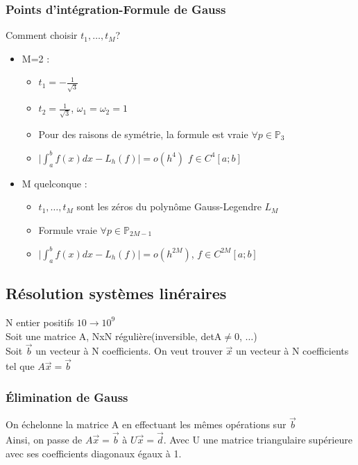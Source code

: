 \documentclass[../main.tex]{subfiles}
\begin{document}
\subsubsection{Points d'intégration-Formule de Gauss}
Comment choisir $t_1, \dots, t_M$?\\
\begin{itemize}
    \item M=2 : \begin{itemize}
        \item $t_1 = -\frac{1}{\sqrt{3}}$\\
        \item $t_2 = \frac{1}{\sqrt{3}}$, $\omega_1 = \omega_2 = 1$\\
        \item Pour des raisons de symétrie, la formule est vraie $\forall p \in \mathbb{P}_3$\\
        \item $\lvert \int_a^b f(x)dx -L_h(f)\rvert = o(h^4)$ $f\in C^4[a;b]$\\
    \end{itemize}
    \item M quelconque : \begin{itemize}
        \item $t_1, \dots, t_M$ sont les zéros du polynôme Gauss-Legendre $L_M$\\
        \item Formule vraie $\forall p \in \mathbb{P}_{2M-1}$\\
        \item $\lvert \int_a^b f(x)dx - L_h(f)\rvert = o(h^{2M})$, $f\in C^{2M}[a;b]$\\
    \end{itemize}
\end{itemize}


\subsection{Résolution systèmes linéraires}
N entier positifs $10 \rightarrow 10^9$\\
Soit une matrice A, NxN régulière(inversible, detA$\neq$0, $\dots$)\\
Soit $\Vec{b}$ un vecteur à N coefficients. On veut trouver $\Vec{x}$ un vecteur à N coefficients tel que $A\Vec{x} = \vec{b}$\\

\subsubsection{Élimination de Gauss}
On échelonne la matrice A en effectuant les mêmes opérations sur $\Vec{b}$\\
Ainsi, on passe de $A\Vec{x} = \Vec{b}$ à $U\Vec{x} = \Vec{d}$. Avec U une matrice triangulaire supérieure avec ses coefficients diagonaux égaux à 1.\\
\end{document}
